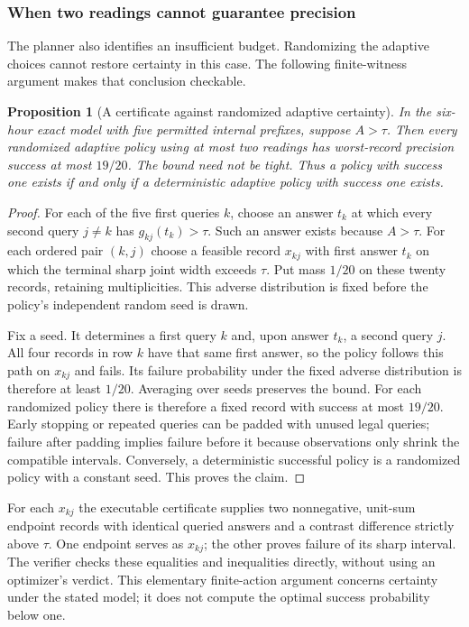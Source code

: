 \documentclass[12pt]{article}
\newtheorem{proposition}{Proposition}
\begin{document}
\subsubsection{When two readings cannot guarantee precision}
\label{sec:assurance-feasibility}
The planner also identifies an insufficient budget. Randomizing the
adaptive choices cannot restore certainty in this case. The following
finite-witness argument makes that conclusion checkable.

\begin{proposition}[A certificate against randomized adaptive certainty]
\label{prop:assurance-feasibility}
In the six-hour exact model with five permitted internal prefixes,
suppose $A>\tau$. Then every randomized
adaptive policy using at most two readings has worst-record precision
success at most $19/20$. The bound need not be tight. Thus a policy with
success one exists if and only if a deterministic adaptive policy with
success one exists.
\end{proposition}
\begin{proof}
For each of the five first queries $k$, choose an answer $t_k$ at which
every second query $j\ne k$ has $g_{kj}(t_k)>\tau$. Such an answer exists
because $A>\tau$. For each ordered pair $(k,j)$ choose a feasible record
$x_{kj}$ with first answer $t_k$ on which the terminal sharp joint width
exceeds $\tau$. Put mass $1/20$ on these twenty records, retaining
multiplicities. This adverse distribution is fixed before the policy's
independent random seed is drawn.

Fix a seed. It determines a first query $k$ and, upon answer $t_k$, a
second query $j$. All four records in row $k$ have that same first answer,
so the policy follows this path on $x_{kj}$ and fails. Its failure
probability under the fixed adverse distribution is therefore at least
$1/20$. Averaging over seeds preserves the bound. For each randomized
policy there is therefore a fixed record with success at most $19/20$.
Early stopping or repeated queries can be padded with unused legal queries;
failure after padding implies failure before it because observations only
shrink the compatible intervals. Conversely, a deterministic successful
policy is a randomized policy with a constant seed. This proves the claim.
\end{proof}

For each $x_{kj}$ the executable certificate supplies two nonnegative,
unit-sum endpoint records with identical queried answers and a contrast
difference strictly above $\tau$. One endpoint serves as $x_{kj}$; the
other proves failure of its sharp interval. The verifier checks these
equalities and inequalities directly, without using an optimizer's verdict.
This elementary finite-action argument concerns certainty under the stated
model; it does not compute the optimal success probability below one.
\end{document}
